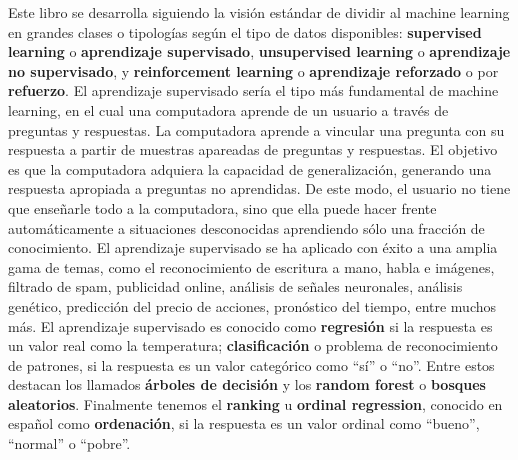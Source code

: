 \documentclass[12pt,]{krantz}
\begin{document}
Este libro se desarrolla siguiendo la visión estándar de dividir al machine learning en grandes clases o tipologías según el tipo de datos disponibles: \textbf{supervised learning} o \textbf{aprendizaje supervisado}, \textbf{unsupervised learning} o \textbf{aprendizaje no supervisado}, y \textbf{reinforcement learning} o \textbf{aprendizaje reforzado} o por \textbf{refuerzo}.
El aprendizaje supervisado sería el tipo más fundamental de machine learning, en el cual una computadora aprende de un usuario a través de preguntas y respuestas. La computadora aprende a vincular una pregunta con su respuesta a partir de muestras apareadas de preguntas y respuestas. El objetivo es que la computadora adquiera la capacidad de generalización, generando una respuesta apropiada a preguntas no aprendidas. De este modo, el usuario no tiene que enseñarle todo a la computadora, sino que ella puede hacer frente automáticamente a situaciones desconocidas aprendiendo sólo una fracción de conocimiento. El aprendizaje supervisado se ha aplicado con éxito a una amplia gama de temas, como el reconocimiento de escritura a mano, habla e imágenes, filtrado de spam, publicidad online, análisis de señales neuronales, análisis genético, predicción del precio de acciones, pronóstico del tiempo, entre muchos más. El aprendizaje supervisado es conocido como \textbf{regresión} si la respuesta es un valor real como la temperatura; \textbf{clasificación} o problema de reconocimiento de patrones, si la respuesta es un valor categórico como ``sí'' o ``no''. Entre estos destacan los llamados \textbf{árboles de decisión} y los \textbf{random forest} o \textbf{bosques aleatorios}. Finalmente tenemos el \textbf{ranking} u \textbf{ordinal regression}, conocido en español como \textbf{ordenación}, si la respuesta es un valor ordinal como ``bueno'', ``normal'' o ``pobre''.
\end{document}
